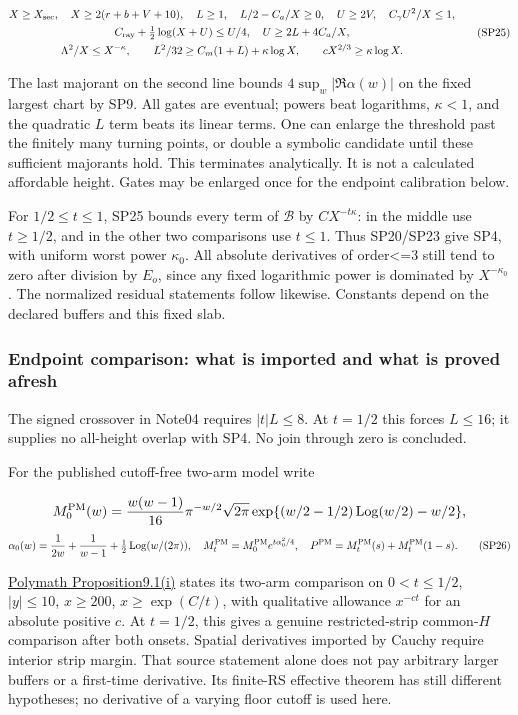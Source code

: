 \[
\begin{gathered}
X\ge X_{\rm sec},\quad X\ge2(r+b+V+10),\quad L\ge1,\quad L/2-C_a/X\ge0,
\quad U\ge2V,\quad C_\gamma U^2/X\le1,\\
C_{\rm ray}+\tfrac12\log(X+U)\le U/4,
\quad U\ge2L+4C_a/X,\\
\Lambda^2/X\le X^{-\kappa},\qquad
L^2/32\ge C_m(1+L)+\kappa\log X,\qquad
cX^{2/3}\ge\kappa\log X.
\end{gathered}
\tag{SP25}\label{eq:ansatz-sp25}
\]

The last majorant on the second line bounds \(4 \sup_{w} |\Re \alpha(w)|\) on the fixed largest chart by SP9. All gates are eventual; powers beat logarithms, \(\kappa<1\), and the quadratic \(L\) term beats its linear terms. One can enlarge the threshold past the finitely many turning points, or double a symbolic candidate until these sufficient majorants hold. This terminates analytically. It is not a calculated affordable height. Gates may be enlarged once for the endpoint calibration below.

For \(1/2\le t\le 1\), SP25 bounds every term of \(\mathcal B\) by \(C X^{-t \kappa}\): in the middle use \(t\ge 1/2\), and in the other two comparisons use \(t\le 1\). Thus SP20/SP23 give SP4, with uniform worst power \(\kappa_0\). All absolute derivatives of order<=3 still tend to zero after division by \(E_{o}\), since any fixed logarithmic power is dominated by \(X^{-\kappa_0}\). The normalized residual statements follow likewise. Constants depend on the declared buffers and this fixed slab.

\subsubsection{Endpoint comparison: what is imported and what is proved afresh}
\label{subsec:sp-8}

The signed crossover in Note04 requires \(|t|L\le 8\). At \(t=1/2\) this forces \(L\le 16\); it supplies no all-height overlap with SP4. No join through zero is concluded.

For the published cutoff-free two-arm model write

\[
M^{\rm PM}_0(w)=\frac{w(w-1)}{16}\pi^{-w/2}\sqrt{2\pi}
 \exp\{(w/2-1/2)\operatorname{Log}(w/2)-w/2\},
\]
\[
\alpha_0(w)=\frac1{2w}+\frac1{w-1}+\tfrac12\operatorname{Log}(w/(2\pi)),
\quad M^{\rm PM}_t=M^{\rm PM}_0e^{t\alpha_0^2/4},\quad
P^{\rm PM}=M^{\rm PM}_t(s)+M^{\rm PM}_t(1-s).
\tag{SP26}\label{eq:ansatz-sp26}
\]

\href{https://arxiv.org/html/1904.12438v2#S9}{Polymath Proposition9.1(i)} states its two-arm comparison on \(0<t\le 1/2\), \(|y|\le 10\), \(x\ge 200\), \(x\ge \exp(C/t)\), with qualitative allowance \(x^{-ct}\) for an absolute positive \(c\). At \(t=1/2\), this gives a genuine restricted-strip common-\(H\) comparison after both onsets. Spatial derivatives imported by Cauchy require interior strip margin. That source statement alone does not pay arbitrary larger buffers or a first-time derivative. Its finite-RS effective theorem has still different hypotheses; no derivative of a varying floor cutoff is used here.

